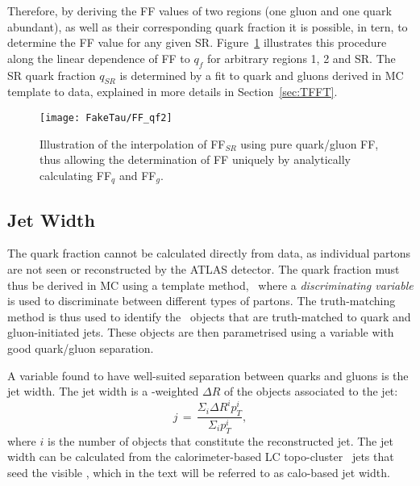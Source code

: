 	Therefore, by deriving the \ac{FF} values of two regions (one gluon and one quark abundant), as well as their corresponding quark fraction it is possible, in tern, to determine the \ac{FF} value for any given \ac{SR}.  
	Figure~\ref{fig:FF_qf2} illustrates this procedure along the linear dependence of FF to $q_f$ for arbitrary regions 1, 2 and SR.
	 The \ac{SR} quark fraction $q_{SR}$ is determined by a fit to quark and gluons derived in \ac{MC} template to data, explained in more details in Section~\ref{sec:TFFT}.
	\begin{figure}[!hbt]
	 \centering
	\texttt{[image: FakeTau/FF\_qf2]}
	\caption{Illustration of the interpolation of FF$_{SR}$ using pure quark/gluon FF, thus allowing the determination of FF uniquely by analytically calculating FF$_q$ and FF$_g$.}
	 \label{fig:FF_qf2}
	 \end{figure}
	
	
	\subsection*{Jet Width}
	\label{jet_width}
	The quark fraction cannot be calculated directly from data, as individual partons are not seen or reconstructed by the \ac{ATLAS} detector.
	The quark fraction must thus be derived in \ac{MC} using a template method, \ie\ where a \textit{discriminating variable} is used to discriminate between different types of partons. 
	The truth-matching method is thus used to identify the \htau\ objects that are truth-matched to quark and gluon-initiated jets. These objects are then parametrised using a variable with good quark/gluon separation. 
	
	A variable found to have well-suited separation between quarks and gluons is the jet width. 
	The jet width is a \pt -weighted $\Delta R$ of the objects associated to the jet:
	\begin{equation} 
	j\,=\,\frac{\Sigma_i\Delta R^i p_T^i}{\Sigma_i	p_T^i},
	\label{eq:jet_width}
	\end{equation}
	where $i$ is the number of objects that constitute the reconstructed jet. 
	The jet width can be calculated from the calorimeter-based \ac{LC} topo-cluster~\cite{Aad_2017} jets that seed the visible \htau, which in the text will be referred to as calo-based jet width.	
	

